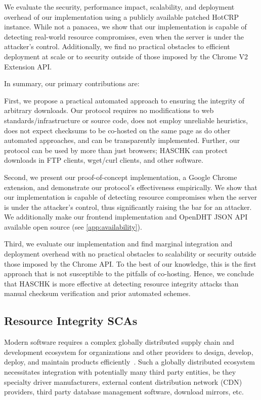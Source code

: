 We evaluate the security, performance impact, scalability, and deployment
overhead of our implementation using a publicly available patched HotCRP
instance. While not a panacea, we show that our implementation is capable of
detecting real-world resource compromises, even when the server is under the
attacker's control. Additionally, we find no practical obstacles to efficient
deployment at scale or to security outside of those imposed by the Chrome V2
Extension API.

In summary, our primary contributions are:

First, we propose a practical automated approach to ensuring the integrity of
arbitrary downloads. Our protocol requires no modifications to web
standards/infrastructure or source code, does not employ unreliable heuristics,
does not expect checksums to be co-hosted on the same page as do other automated
approaches, and can be transparently implemented. Further, our protocol can be
used by more than just browsers; HASCHK can protect downloads in FTP clients,
wget/curl clients, and other software.

Second, we present our proof-of-concept implementation, a Google Chrome
extension, and demonstrate our protocol's effectiveness empirically. We show
that our implementation is capable of detecting resource compromises when the
server is under the attacker's control, thus significantly raising the bar for
an attacker. We additionally make our frontend implementation and OpenDHT JSON
API available open source (see \cref{app:availability}).

Third, we evaluate our implementation and find marginal integration and
deployment overhead with no practical obstacles to scalability or security
outside those imposed by the Chrome API. To the best of our knowledge, this is
the first approach that is not susceptible to the pitfalls of co-hosting. Hence,
we conclude that HASCHK is more effective at detecting resource integrity
attacks than manual checksum verification and prior automated schemes.

\subsection{Resource Integrity SCAs}

Modern software requires a complex globally distributed supply chain and
development ecosystem for organizations and other providers to design, develop,
deploy, and maintain products efficiently~\cite{SCA}. Such a globally
distributed ecosystem necessitates integration with potentially many third party
entities, be they specialty driver manufacturers, external content distribution
network (CDN) providers, third party database management software, download
mirrors, etc.

